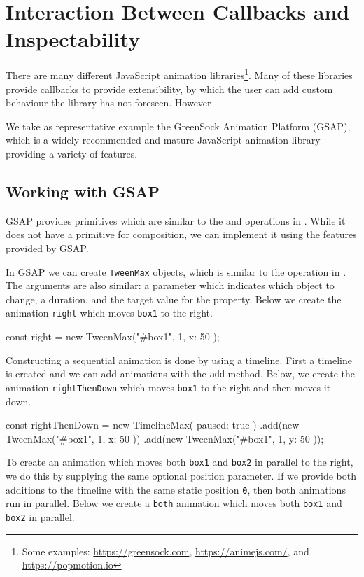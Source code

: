 \section{Interaction Between Callbacks and Inspectability}
\label{sec:evaluation}

There are many different JavaScript animation libraries\footnote{Some examples: \url{https://greensock.com}, \url{https://animejs.com/}, and \url{https://popmotion.io}}. Many of these libraries provide callbacks to provide extensibility, by which the user can add custom behaviour the library has not foreseen. However

We take as representative example the GreenSock Animation Platform (GSAP), which is a widely recommended and mature JavaScript animation library providing a variety of features.

\subsection{Working with GSAP}

GSAP provides primitives which are similar to the  and  operations in \dsl{}. While it does not have a primitive for  composition, we can implement it using the features provided by GSAP.

In GSAP we can create \texttt{TweenMax} objects, which is similar to the  operation in \dsl{}. The arguments are also similar: a parameter which indicates which object to change, a duration, and the target value for the property. Below we create the animation \texttt{right} which moves \texttt{box1} to the right.

\begin{js}
const right = new TweenMax("#box1", 1, { x: 50 });
\end{js}

Constructing a sequential animation is done by using a timeline. First a timeline is created and we can add animations with the \texttt{add} method. Below, we create the animation \texttt{rightThenDown} which moves \texttt{box1} to the right and then moves it down.

\begin{js}
const rightThenDown = new TimelineMax({ paused: true })
  .add(new TweenMax("#box1", 1, { x: 50 }))
  .add(new TweenMax("#box1", 1, { y: 50 }));
\end{js}

To create an animation which moves both \texttt{box1} and \texttt{box2} in parallel to the right, we do this by supplying the same optional position parameter. If we provide both additions to the timeline with the same static position \texttt{0}, then both animations run in parallel. Below we create a \texttt{both} animation which moves both \texttt{box1} and \texttt{box2} in parallel.

